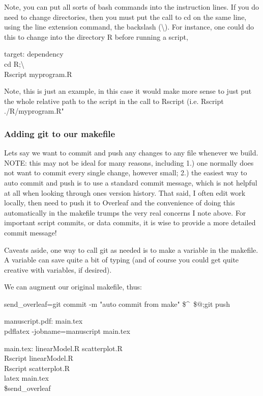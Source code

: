 \documentclass{article}
\begin{document}
Note, you can put all sorts of {\sf bash} commands into the instruction lines. If you do need to change directories, then you must put the call to cd on the same line, using the line extension command, the backslash (\textbackslash). For instance, one could do this to change into the directory R before running a script, 

target: dependency\\
\tab cd R;\textbackslash\\
\tab Rscript myprogram.R

Note, this is just an example, in this case it would make more sense to just put the whole relative path to the script in the call to {\sf Rscript} (i.e. Rscript ./R/myprogram.R"

\subsubsection{Adding {\sf git} to our makefile}

Lets say we want to commit and push any changes to any file whenever we build. NOTE: this may not be ideal for many reasons, including 1.) one normally does not want to commit every single change, however small; 2.) the easiest way to auto commit and push is to use a standard commit message, which is not helpful at all when looking through ones version history. That said, I often edit work locally, then need to push it to {\sf Overleaf} and the convenience of doing this automatically in the makefile trumps the very real concerns I note above. For important script commits, or data commits, it is wise to provide a more detailed commit message!

Caveats aside, one way to call {\sf git} as needed is to make a variable in the makefile. A variable can save quite a bit of typing (and of course you could get quite creative with variables, if desired).

We can augment our original makefile, thus:

send\_overleaf=git commit -m "auto commit from make" \$\textasciicircum\ \$$@$;git push

manuscript.pdf: main.tex\\
\tab pdflatex -jobname=manuscript main.tex

main.tex: linearModel.R scatterplot.R\\
\tab Rscript linearModel.R\\
\tab Rscript scatterplot.R\\
\tab latex main.tex\\
\tab \${send\_overleaf}
\end{document}
